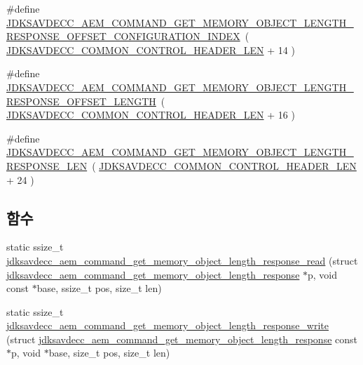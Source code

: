 \begin{DoxyCompactItemize}
\item 
\#define \hyperlink{group__command__get__memory__object__length__response_gaae1b2c8dd47ad39f0635cbbfac5ba365}{J\+D\+K\+S\+A\+V\+D\+E\+C\+C\+\_\+\+A\+E\+M\+\_\+\+C\+O\+M\+M\+A\+N\+D\+\_\+\+G\+E\+T\+\_\+\+M\+E\+M\+O\+R\+Y\+\_\+\+O\+B\+J\+E\+C\+T\+\_\+\+L\+E\+N\+G\+T\+H\+\_\+\+R\+E\+S\+P\+O\+N\+S\+E\+\_\+\+O\+F\+F\+S\+E\+T\+\_\+\+C\+O\+N\+F\+I\+G\+U\+R\+A\+T\+I\+O\+N\+\_\+\+I\+N\+D\+EX}~( \hyperlink{group__jdksavdecc__avtp__common__control__header_gaae84052886fb1bb42f3bc5f85b741dff}{J\+D\+K\+S\+A\+V\+D\+E\+C\+C\+\_\+\+C\+O\+M\+M\+O\+N\+\_\+\+C\+O\+N\+T\+R\+O\+L\+\_\+\+H\+E\+A\+D\+E\+R\+\_\+\+L\+EN} + 14 )
\item 
\#define \hyperlink{group__command__get__memory__object__length__response_gaf0246e10c76855d11d273c495ea83377}{J\+D\+K\+S\+A\+V\+D\+E\+C\+C\+\_\+\+A\+E\+M\+\_\+\+C\+O\+M\+M\+A\+N\+D\+\_\+\+G\+E\+T\+\_\+\+M\+E\+M\+O\+R\+Y\+\_\+\+O\+B\+J\+E\+C\+T\+\_\+\+L\+E\+N\+G\+T\+H\+\_\+\+R\+E\+S\+P\+O\+N\+S\+E\+\_\+\+O\+F\+F\+S\+E\+T\+\_\+\+L\+E\+N\+G\+TH}~( \hyperlink{group__jdksavdecc__avtp__common__control__header_gaae84052886fb1bb42f3bc5f85b741dff}{J\+D\+K\+S\+A\+V\+D\+E\+C\+C\+\_\+\+C\+O\+M\+M\+O\+N\+\_\+\+C\+O\+N\+T\+R\+O\+L\+\_\+\+H\+E\+A\+D\+E\+R\+\_\+\+L\+EN} + 16 )
\item 
\#define \hyperlink{group__command__get__memory__object__length__response_ga4b8656b534a95d88e724d1c8c4073d58}{J\+D\+K\+S\+A\+V\+D\+E\+C\+C\+\_\+\+A\+E\+M\+\_\+\+C\+O\+M\+M\+A\+N\+D\+\_\+\+G\+E\+T\+\_\+\+M\+E\+M\+O\+R\+Y\+\_\+\+O\+B\+J\+E\+C\+T\+\_\+\+L\+E\+N\+G\+T\+H\+\_\+\+R\+E\+S\+P\+O\+N\+S\+E\+\_\+\+L\+EN}~( \hyperlink{group__jdksavdecc__avtp__common__control__header_gaae84052886fb1bb42f3bc5f85b741dff}{J\+D\+K\+S\+A\+V\+D\+E\+C\+C\+\_\+\+C\+O\+M\+M\+O\+N\+\_\+\+C\+O\+N\+T\+R\+O\+L\+\_\+\+H\+E\+A\+D\+E\+R\+\_\+\+L\+EN} + 24 )
\end{DoxyCompactItemize}
\subsection*{함수}
\begin{DoxyCompactItemize}
\item 
static ssize\+\_\+t \hyperlink{group__command__get__memory__object__length__response_gacc7edb5a6550e38a4584d552ef7a9122}{jdksavdecc\+\_\+aem\+\_\+command\+\_\+get\+\_\+memory\+\_\+object\+\_\+length\+\_\+response\+\_\+read} (struct \hyperlink{structjdksavdecc__aem__command__get__memory__object__length__response}{jdksavdecc\+\_\+aem\+\_\+command\+\_\+get\+\_\+memory\+\_\+object\+\_\+length\+\_\+response} $\ast$p, void const $\ast$base, ssize\+\_\+t pos, size\+\_\+t len)
\item 
static ssize\+\_\+t \hyperlink{group__command__get__memory__object__length__response_ga0958c24db60caea4dab6571741ce9fa9}{jdksavdecc\+\_\+aem\+\_\+command\+\_\+get\+\_\+memory\+\_\+object\+\_\+length\+\_\+response\+\_\+write} (struct \hyperlink{structjdksavdecc__aem__command__get__memory__object__length__response}{jdksavdecc\+\_\+aem\+\_\+command\+\_\+get\+\_\+memory\+\_\+object\+\_\+length\+\_\+response} const $\ast$p, void $\ast$base, size\+\_\+t pos, size\+\_\+t len)
\end{DoxyCompactItemize}


